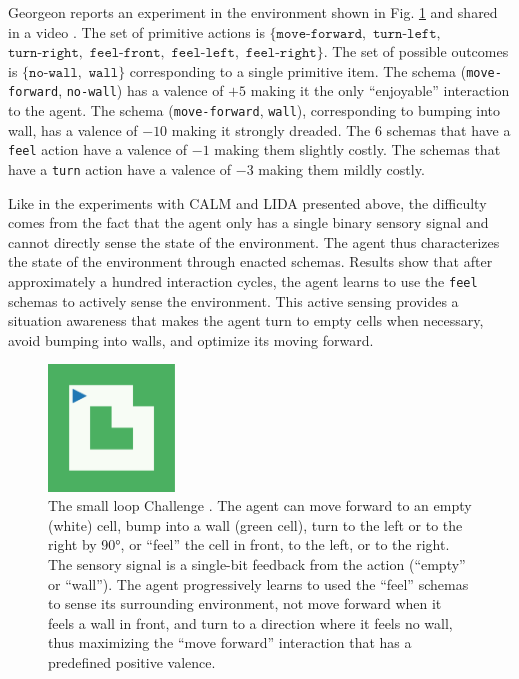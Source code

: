 \documentclass[runningheads]{llncs}
\begin{document}
Georgeon \cite{georgeon_small_2012} reports an experiment in the environment shown in Fig. \ref{fig:georgeon} and shared in a video \cite{georgeon_video_2012}.
The set of primitive actions is $\{ \texttt{move-forward},$ $\texttt{turn-left},$ $\texttt{turn-right},$ $\texttt{feel-front},$ $\texttt{feel-left},$ $\texttt{feel-right}\}$.
The set of possible outcomes is $\{ \texttt{no-wall},$ $ \texttt{wall} \}$ corresponding to a single primitive item. 
The schema (\texttt{move-forward}, \texttt{no-wall}) has a valence of $+5$ making it the only ``enjoyable'' interaction to the agent. 
The schema (\texttt{move-forward}, \texttt{wall}), corresponding to bumping into wall, has a valence of $-10$ making it strongly dreaded. 
The 6 schemas that have a \texttt{feel} action have a valence of $-1$ making them slightly costly. 
The schemas that have a \texttt{turn} action  have a valence of $-3$ making them mildly costly. 

Like in the experiments with CALM and LIDA presented above, the difficulty comes from the fact that the agent only has a single binary sensory signal and cannot directly sense the state of the environment. 
The agent thus characterizes the state of the environment through enacted schemas. 
Results show that after approximately a hundred interaction cycles, the agent learns to use the \texttt{feel} schemas to actively sense the environment. 
This active sensing provides a situation awareness that makes the agent turn to empty cells when necessary, avoid bumping into walls, and optimize its moving forward. 

\begin{figure}
	\centering
	\includegraphics[width=0.3\textwidth]{Figure_grid_plot.pdf}
	\caption{The small loop Challenge \cite{georgeon_small_2012}.
		The agent can move forward to an empty (white) cell, bump into a wall (green cell), turn to the left or to the right by 90°, or ``feel'' the cell in front, to the left, or to the right. 
		The sensory signal is a single-bit feedback from the action (``empty'' or ``wall''). 	
		The agent progressively learns to used the ``feel'' schemas to sense its surrounding environment, not move forward when it feels a wall in front, and turn to a direction where it feels no wall, thus maximizing the ``move forward'' interaction that has a predefined positive valence.
	} 
	\label{fig:georgeon}
\end{figure}
\end{document}
